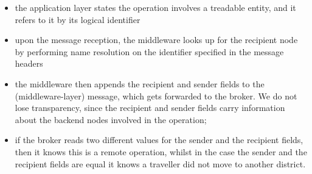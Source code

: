 \begin{itemize}
  \item the application layer states the operation involves a treadable entity,
    and it refers to it by its logical identifier
  \item upon the message reception, the middleware looks up for the recipient
    node by performing name resolution on the identifier specified in the
    message headers
  \item the middleware then appends the recipient and sender fields to the
    (middleware-layer) message, which gets forwarded to the broker. We do not
    lose transparency, since the recipient and sender fields carry information
    about the backend nodes involved in the operation;
  \item if the broker reads two different values for the sender and the
    recipient fields, then it knows this is a remote operation, whilst in the
    case the sender and the recipient fields are equal it knows a traveller did
    not move to another district.
\end{itemize}
